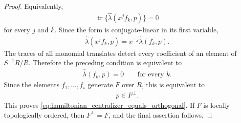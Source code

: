 \documentclass[10pt,a4paper]{amsart}
\def\hl{{\hat \lambda}}
\def\tr{\operatorname{tr}}
\begin{document}
\begin{proof}
Equivalently,
\begin{align}
    \tr\{\hl(x^jf_k,p)\}=0
\end{align}
for every $j$ and $k$. Since the form is conjugate-linear in its first
variable,
\begin{align}
    \hl(x^jf_k,p)=x^{-j}\hl(f_k,p).
\end{align}
The traces of all monomial translates detect every coefficient of an element
of $S^{-1}R/R$. Therefore the preceding condition is equivalent to
\begin{align}
    \hl(f_k,p)=0
    \qquad
    \text{for every }k.
\end{align}
Since the elements $f_1,\ldots,f_s$ generate $F$ over $R$, this is
equivalent to
\begin{align}
    p\in F^{\perp}.
\end{align}
This proves
\eqref{eq:hamiltonian_centralizer_equals_orthogonal}. If $F$ is locally
topologically ordered, then $F^{\perp}=F$, and the final assertion follows.
\end{proof}
\end{document}
